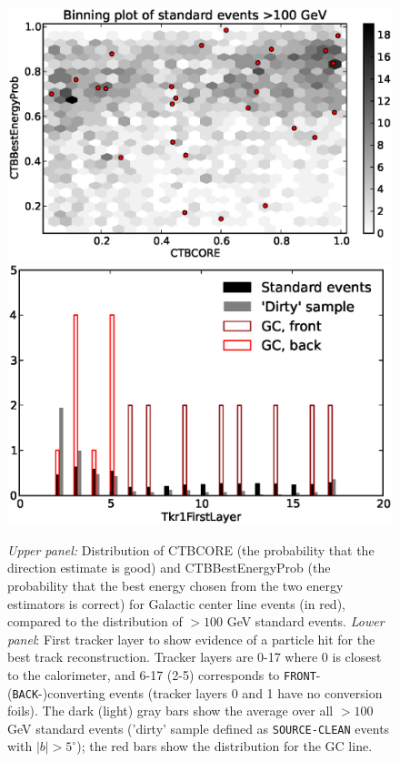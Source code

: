 \documentclass[aps,twocolumn,prd,superscriptaddress,showpacs,nofootinbib,fixfloat]{revtex4}
\begin{document}
\begin{figure}
  \centering
  \includegraphics[width=1.00\linewidth]{plots/CTBCORE_CTBBestEnergyProb.eps}
  \includegraphics[width=1.00\linewidth]{plots/Tkr1FirstLayer.eps}
  \caption{\emph{Upper panel:} Distribution of CTBCORE (the
  probability that the direction estimate is good) and
  CTBBestEnergyProb (the probability that the best energy
  chosen from the two energy estimators is correct) for
  Galactic center line events (in red), compared to the
  distribution of $>100$ GeV standard events. \emph{Lower
  panel}: First tracker layer to show evidence of a particle
  hit for the best track reconstruction. Tracker layers are
  0-17 where 0 is closest to the calorimeter, and 6-17 (2-5)
  corresponds to \texttt{FRONT}- (\texttt{BACK}-)converting events (tracker
  layers 0 and 1 have no conversion foils). The dark (light) gray
  bars show the average over all $>100$ GeV
  standard events ('dirty' sample defined as \texttt{SOURCE-CLEAN} events with
  $|b|>5^\circ$); the red bars show the distribution for the GC line.}
  \label{fig:CTBquality}
\end{figure}
\end{document}
